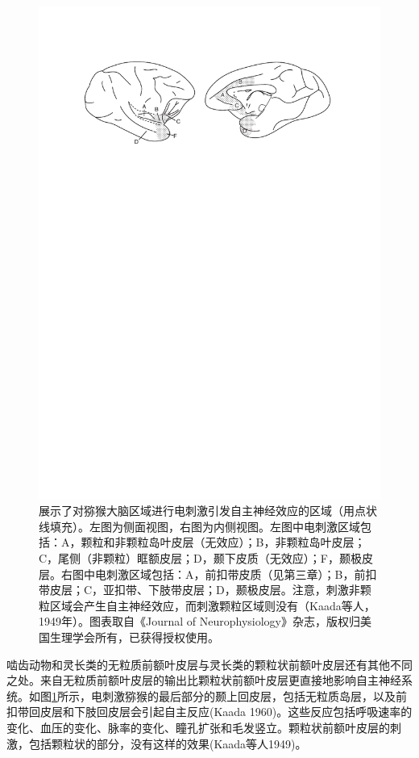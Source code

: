 \begin{figure}[!htb]
	\centering
	\includegraphics[width=0.8\linewidth]{image_pfc/Fig_2_4}
	\caption{展示了对猕猴大脑区域进行电刺激引发自主神经效应的区域（用点状线填充）。左图为侧面视图，右图为内侧视图。左图中电刺激区域包括：A，颗粒和非颗粒岛叶皮层（无效应）；B，非颗粒岛叶皮层；C，尾侧（非颗粒）眶额皮层；D，颞下皮质（无效应）；F，颞极皮层。右图中电刺激区域包括：A，前扣带皮质（见第三章）；B，前扣带皮层；C，亚扣带、下肢带皮层；D，颞极皮层。注意，刺激非颗粒区域会产生自主神经效应，而刺激颗粒区域则没有（Kaada等人，1949年）。图表取自《Journal of  Neurophysiology》杂志，版权归美国生理学会所有，已获得授权使用。\label{fig:fig_2_4}}
\end{figure}

啮齿动物和灵长类的无粒质前额叶皮层与灵长类的颗粒状前额叶皮层还有其他不同之处。来自无粒质前额叶皮层的输出比颗粒状前额叶皮层更直接地影响自主神经系统。如图\ref{fig:fig_2_4}所示，电刺激猕猴的最后部分的颞上回皮层，包括无粒质岛层，以及前扣带回皮层和下肢回皮层会引起自主反应(Kaada 1960)。这些反应包括呼吸速率的变化、血压的变化、脉率的变化、瞳孔扩张和毛发竖立。颗粒状前额叶皮层的刺激，包括颗粒状的部分，没有这样的效果(Kaada等人1949)。

